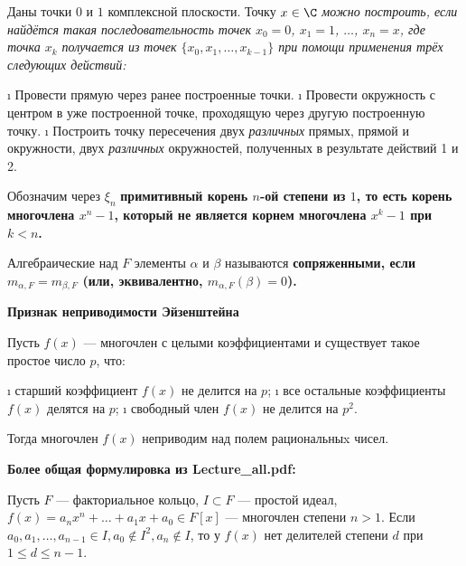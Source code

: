 \begin{defn}
Даны точки \(0\) и \(1\) комплексной плоскости. Точку \(x \in \C\) \it{можно построить}, если найдётся такая последовательность точек \(x_0=0\), \(x_1=1\), \(\ldots\), \(x_n=x\), где точка \(x_k\) получается из точек \(\{x_0,x_1,\ldots, x_{k-1}\}\) при помощи применения трёх следующих действий:

\begin{enumerate}
\def\labelenumi{\arabic{enumi}.}
\tightlist
\i
  Провести прямую через ранее построенные точки.
\i
  Провести окружность с центром в уже построенной точке, проходящую через другую построенную точку.
\i
  Построить точку пересечения двух \emph{различных} прямых, прямой и окружности, двух \emph{различных} окружностей, полученных в результате действий 1 и 2.
\end{enumerate}

\end{defn}

\begin{defn}
Обозначим через \(\xi_n\) \bf{примитивный корень} \(n\)-ой степени из \(1\), то есть корень многочлена \(x^n-1\), который не является корнем многочлена \(x^k-1\) при \(k<n\).
\end{defn}

\begin{defn}
Алгебраические над \(F\) элементы \(\alpha\) и \(\beta\) называются \bf{сопряженными}, если \(m_{\alpha,F} = m_{\beta,F}\) (или, эквивалентно, \(m_{\alpha,F}(\beta)=0\)).
\end{defn}

\begin{defn}
\bf{Признак неприводимости Эйзенштейна}

Пусть \(f(x)\) --- многочлен с целыми коэффициентами и существует такое простое число \(p\), что:

\begin{enumerate}
\def\labelenumi{\arabic{enumi}.}
\tightlist
\i
  старший коэффициент \(f(x)\) не делится на \(p\);
\i
  все остальные коэффициенты \(f(x)\) делятся на \(p\);
\i
  свободный член \(f(x)\) не делится на \(p^2\).
\end{enumerate}

Тогда многочлен \(f(x)\) неприводим над полем рациональныx чисел.

\bf{Более общая формулировка из Lecture\_all.pdf:}

Пусть \(F\) --- факториальное кольцо, \(I \subset F\) --- простой идеал, \(f(x) = a_nx^n+\dots+a_1x + a_0 \in F [x]\) --- многочлен степени \(n > 1\).
Если \(a_0, a_1, \dots, a_{n-1} \in I, a_0 \not\in I^2, a_n \not\in I\), то у \(f(x)\) нет делителей степени \(d\) при \(1 \le d\le n-1\).

\end{defn}

